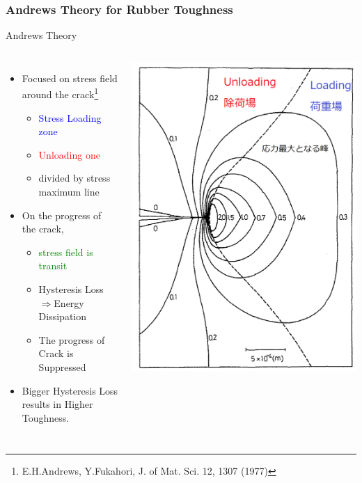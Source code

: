 \documentclass[12pt, dvipdfmx]{beamer}
\begin{document}
\begin{frame}
	\frametitle{Andrews Theory for Rubber Toughness}
		\begin{exampleblock}{Andrews Theory}
			\begin{columns}[T, onlytextwidth]
				\begin{itemize}
					\item Focused on stress field around the crack\footnote{
						\scriptsize
			{E.H.Andrews, Y.Fukahori, J. of Mat. Sci. 12, 1307 (1977)}
					}
						\begin{itemize}
							\item \textcolor{blue}{Stress Loading zone}
							\item \textcolor{red}{Unloading one}
							\item divided by stress maximum line
						\end{itemize}
					\item On the progress of the crack, 
						\begin{itemize}
							\item \textcolor{green}{stress field is transit}
							\item Hysteresis Loss$\Rightarrow${Energy Dissipation}
							\item The progress of Crack is \alert{Suppressed}
						\end{itemize}
					\item Bigger Hysteresis Loss results in  Higher Toughness.
				\end{itemize}
					\begin{center}
						\includegraphics[width=.85\textwidth]{crack.png}

\end{center}
\end{columns}
\end{exampleblock}
\end{frame}
\end{document}
